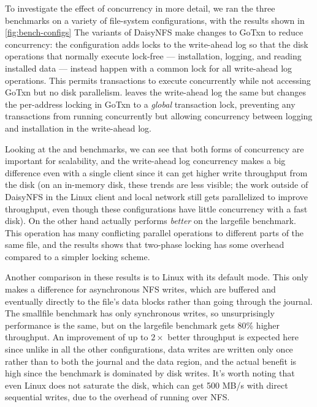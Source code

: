 To investigate the effect of concurrency in more detail, we ran the three
benchmarks on a variety of file-system configurations, with the results shown in
\cref{fig:bench-configs} 
The variants of DaisyNFS make changes to GoTxn to reduce concurrency: the
 configuration adds locks to the write-ahead log so that the
disk operations that normally execute lock-free --- installation, logging, and
reading installed data --- instead happen with a common lock for all write-ahead
log operations. This permits transactions to execute concurrently while not
accessing GoTxn but no disk parallelism.  leaves the
write-ahead log the same but changes the per-address locking in GoTxn to a
\emph{global} transaction lock, preventing any transactions from running
concurrently but allowing concurrency between logging and installation in the
write-ahead log.

Looking at the  and  benchmarks, we can see
that both forms of concurrency are important for scalability, and the
write-ahead log concurrency makes a big difference even with a single client
since it can get higher write throughput from the disk (on an in-memory disk,
these trends are less visible; the work outside of DaisyNFS in the Linux client
and local network still gets parallelized to improve throughput, even though
these configurations have little concurrency with a fast disk). On the other
hand  actually performs \emph{better} on the largefile
benchmark. This operation has many conflicting parallel operations to different
parts of the same file, and the results shows that two-phase locking has some
overhead compared to a simpler locking scheme.

Another comparison in these results is to Linux with its default
 mode. This only makes a difference for asynchronous NFS
writes, which are buffered and eventually directly to the file's data blocks
rather than going through the journal. The smallfile benchmark has only
synchronous writes, so unsurprisingly performance is the same, but on the
largefile benchmark  gets 80\% higher throughput. An
improvement of up to $2\times$ better throughput is expected here since unlike
in all the other configurations, data writes are written only once rather than
to both the journal and the data region, and the actual benefit is high since
the benchmark is dominated by disk writes. It's worth noting that even Linux
does not saturate the disk, which can get 500 MB/s with direct sequential
writes, due to the overhead of running over NFS.

